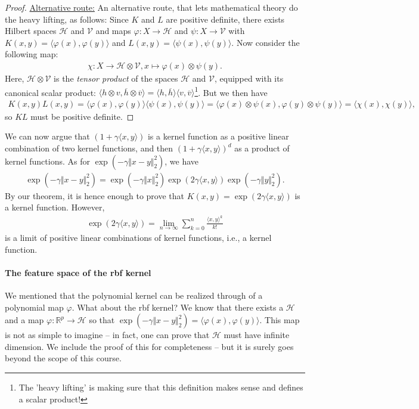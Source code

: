 \documentclass{article}
\newcommand{\calH}{\mathcal{H}}
\newcommand{\sprod}[1]{\langle #1 \rangle}
\newcommand{\calV}{\mathcal{V}}
\newcommand{\R}{\mathbb{R}}
\newcommand{\norm}[1]{\Vert #1 \Vert}
\begin{document}
\begin{proof}
    \underline{Alternative route:} An alternative route, that lets mathematical theory do the heavy lifting, as follows: Since $K$ and $L$ are positive definite, there exists Hilbert spaces $\calH$ and $\calV$ and maps $\varphi:X\to \calH$ and $\psi:X\to \calV$ with $K(x,y)=\sprod{\varphi(x),\varphi(y)}$ and $L(x,y) = \sprod{\psi(x),\psi(y)}$. Now consider the following map:
    \begin{align*}
        \chi: X \to \calH \otimes \calV, x \mapsto \varphi(x)\otimes \psi(y).
    \end{align*}
    Here, $\calH \otimes \calV$ is the \emph{tensor product} of the spaces $\calH$ and $\calV$, equipped with its canonical scalar product: $\sprod{h\otimes v,\overline{h}\otimes\overline{v}}=\sprod{h,\overline{h}}\sprod{v,\overline{v}}$\footnote{The 'heavy lifting' is making sure that this definition makes sense and defines a scalar product!}. But we then have
    \begin{align*}
        K(x,y)L(x,y) = \sprod{\varphi(x),\varphi(y)}\sprod{\psi(x),\psi(y)} = \sprod{\varphi(x)\otimes \psi(x),\varphi(y)\otimes \psi(y)} = \sprod{\chi(x),\chi(y)},
    \end{align*}
    so $KL$ must be positive definite.
\end{proof}
We can now argue that $(1+\gamma\sprod{x,y})$ is a kernel function as a positive linear combination of two kernel functions, and then $(1+\gamma\sprod{x,y})^d$ as a product of kernel functions. As for $\exp(-\gamma \norm{x-y}_2^2)$, we have
\begin{align*}
   \exp(-\gamma \norm{x-y}_2^2) = \exp(-\gamma\norm{x}_2^2) \exp(2\gamma \sprod{x,y})\exp(-\gamma \norm{y}_2^2).
\end{align*}
By our theorem, it is hence enough to prove that $K(x,y) =\exp(2\gamma \sprod{x,y})$ is a kernel function. However,
\begin{align*}
    \exp(2\gamma \sprod{x,y}) = \lim_{n\to \infty} \sum_{k=0}^n \frac{\sprod{x,y}^k}{k!}
\end{align*}
is a limit of positive linear combinations of kernel functions, i.e., a kernel function.

\paragraph{The feature space of the rbf kernel} We mentioned that the polynomial kernel can be realized through of a polynomial map $\varphi$. What about the rbf kernel? We know that there exists a $\calH$ and a map $\varphi:\R^p\to \calH$ so that $\exp(-\gamma\norm{x-y}_2^2)= \sprod{\varphi(x),\varphi(y)}$. This map is not as simple to imagine -- in fact, one can prove that $\calH$ must have infinite dimension. We include the proof of this for completeness -- but it is surely goes beyond the scope of this course.
\end{document}
